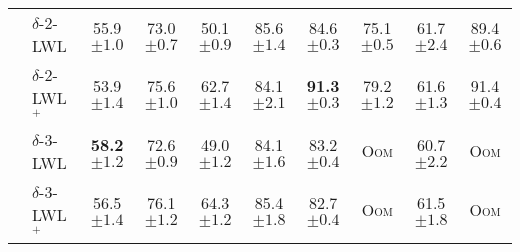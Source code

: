 \begin{table}
{\begin{tabular}{@{}c <{\enspace}@{}lcccccccc@{}}
			                                                         & \textsf{$\delta$-$2$-LWL}     & 55.9  \scriptsize	$\pm 1.0$         & 73.0     \scriptsize $\pm 0.7$          & 50.1 \scriptsize $\pm 0.9$            & 85.6  \scriptsize $\pm 1.4$          & 84.6  \scriptsize $\pm 0.3$         & 75.1 \scriptsize $\pm 0.5$           & 61.7 \scriptsize $\pm 2.4 $         & 89.4  \scriptsize $\pm 0.6$         
			\\    		
			                                                         & \textsf{$\delta$-$2$-LWL\xspace$\!\!^+$} & 53.9  \scriptsize	$\pm 1.4$         & 75.6  \scriptsize $\pm 1.0$             & 62.7 \scriptsize $\pm 1.4$            & 84.1  \scriptsize $\pm 2.1$          & \textbf{91.3} \scriptsize $\pm 0.3$ & 79.2 \scriptsize $\pm 1.2$           & 61.6  \scriptsize $\pm 1.3$         & 91.4 \scriptsize $\pm 0.4$          
			\\ 
			                                                         & \textsf{$\delta$-$3$-LWL}     & \textbf{58.2} \scriptsize	$\pm 1.2$ & 72.6     \scriptsize $\pm 0.9 $         & 49.0 \scriptsize $\pm 1.2$            & 84.1   \scriptsize $\pm 1.6$         & 83.2  \scriptsize $\pm 0.4$         & \textsc{Oom}                         & 60.7 \scriptsize $\pm 2.2  $        & \textsc{Oom}                        
			\\ 
			                                                         & \textsf{$\delta$-$3$-LWL\xspace$\!\!^+$} & 56.5 \scriptsize	$\pm 1.4$          & 76.1  \scriptsize $\pm 1.2$             & 64.3 \scriptsize $\pm 1.2$            & 85.4   \scriptsize $\pm 1.8$         & 82.7  \scriptsize $\pm 0.4$         & \textsc{Oom}                         & 61.5   \scriptsize $\pm 1.8$        & \textsc{Oom}                        
			\\ 
						
			\cmidrule{2-10}	
						

\end{tabular}}
\end{table}
